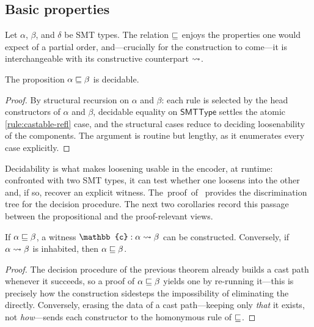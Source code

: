 \subsection{Basic properties}

Let $\alpha$, $\beta$, and $\delta$ be SMT types. The relation $ \sqsubseteq $ enjoys the properties one would expect of a partial order, and---crucially for the construction to come---it is interchangeable with its constructive counterpart $ \rightsquigarrow $.

\begin{theorem}
  \label{thm:castable-decidable}
  The proposition $\alpha \sqsubseteq \beta$ is decidable.
\end{theorem}
\begin{proof}
By structural recursion on $\alpha$ and $\beta$: each rule is selected by the head constructors of $\alpha$ and $\beta$, decidable equality on $\mathsf{SMTType}$ settles the atomic \ref{rule:castable-refl} case, and the structural cases reduce to deciding loosenability of the components. The argument is routine but lengthy, as it enumerates every case explicitly.
\end{proof}

Decidability is what makes loosening usable in the encoder, \ie at runtime: confronted with two SMT types, it can test whether one loosens into the other and, if so, recover an explicit witness. The~proof~of~ provides the discrimination tree for the decision procedure.
The next two corollaries record this passage between the propositional and the proof-relevant views.

\begin{corollary}
\label{cor:castable-constructive}
  If $\alpha \sqsubseteq \beta$, a witness $\mathbb{c} : \castpath{\alpha}{\beta}$ can be constructed.
  Conversely, if $\alpha \rightsquigarrow \beta$ is inhabited, then $\alpha \sqsubseteq \beta$.
\end{corollary}

\begin{proof}
  The decision procedure of the previous theorem already builds a cast path whenever it succeeds, so a proof of $\alpha \sqsubseteq \beta$ yields one by re-running it---this is precisely how the construction sidesteps the impossibility of eliminating the  directly. Conversely, erasing the data of a cast path---keeping only \emph{that} it exists, not \emph{how}---sends each constructor to the homonymous rule of $ \sqsubseteq $.
\end{proof}

